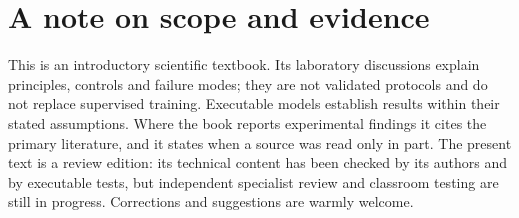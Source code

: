 \section*{A note on scope and evidence}
This is an introductory scientific textbook. Its laboratory discussions
explain principles, controls and failure modes; they are not validated
protocols and do not replace supervised training. Executable models establish
results within their stated assumptions. Where the book reports experimental
findings it cites the primary literature, and it states when a source was read
only in part. The present text is a review edition: its technical content has
been checked by its authors and by executable tests, but independent
specialist review and classroom testing are still in progress. Corrections and
suggestions are warmly welcome.
